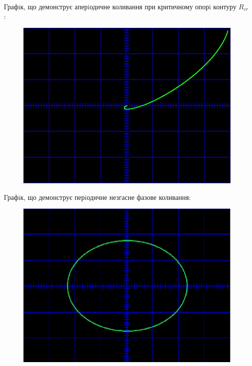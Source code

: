 \documentclass[12pt,a4paper]{article}
\begin{document}
    Графiк, що демонструє аперiодичне коливання при критичному опорi контуру $R_{cr}$:

    \begin{figure}[ht]
        \includegraphics[width=1\textwidth]{aperiodic2.jpg}
    \end{figure}

    \newpage

    Графiк, що демонструє перiодичне незгасне фазове коливання:

    \begin{figure}[ht]
        \includegraphics[width=1\textwidth]{YEY1.png}
    \end{figure}

    \newpage
\end{document}
